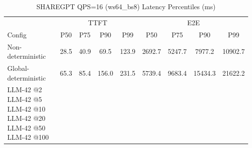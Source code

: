 \begin{table}[htbp]
\centering
\caption{SHAREGPT QPS=16 (ws64_bs8) Latency Percentiles (ms)}
\label{tab:sharegpt_qps16_ws64_bs8}
\begin{tabular}{l|cccc|cccc}
\toprule
& \multicolumn{4}{c|}{TTFT} & \multicolumn{4}{c}{E2E} \\
Config & P50 & P75 & P90 & P99 & P50 & P75 & P90 & P99 \\
\midrule
Non-deterministic & 28.5 & 40.9 & 69.5 & 123.9 & 2692.7 & 5247.7 & 7977.2 & 10902.7 \\
Global-deterministic & 65.3 & 85.4 & 156.0 & 231.5 & 5739.4 & 9683.4 & 15434.3 & 21622.2 \\
LLM-42 @2%
LLM-42 @5%
LLM-42 @10%
LLM-42 @20%
LLM-42 @50%
LLM-42 @100%
\bottomrule
\end{tabular}
\end{table}

